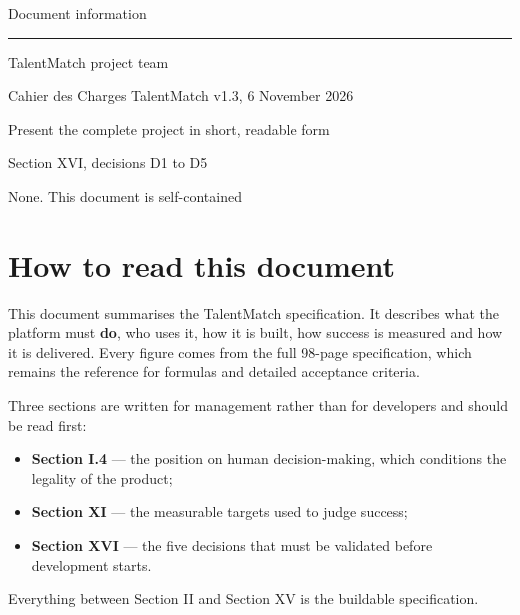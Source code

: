 \documentclass[11pt,a4paper]{article}
\begin{document}
\setcounter{tocdepth}{2}
\tableofcontents
\vfill
\begin{center}\sffamily\small\color{graytext}Document information\end{center}\vspace{-0.6em}
{\color{grayline}\rule{\linewidth}{0.4pt}}\par\vspace{-0.3em}
{\small\sffamily\setlength{\parindent}{0pt}
TalentMatch project team\par\vspace{3pt}
Cahier des Charges TalentMatch v1.3, 6 November 2026\par\vspace{3pt}
Present the complete project in short, readable form\par\vspace{3pt}
Section XVI, decisions D1 to D5\par\vspace{3pt}
None. This document is self-contained\par}
\clearpage

\section*{How to read this document}
This document summarises the TalentMatch specification. It describes what the platform must \textbf{do}, who uses it, how it is built, how success is measured and how it is delivered. Every figure comes from the full 98-page specification, which remains the reference for formulas and detailed acceptance criteria.

Three sections are written for management rather than for developers and should be read first:
\begin{itemize}
  \item \textbf{Section I.4} --- the position on human decision-making, which conditions the legality of the product;
  \item \textbf{Section XI} --- the measurable targets used to judge success;
  \item \textbf{Section XVI} --- the five decisions that must be validated before development starts.
\end{itemize}
Everything between Section II and Section XV is the buildable specification.
\end{document}
